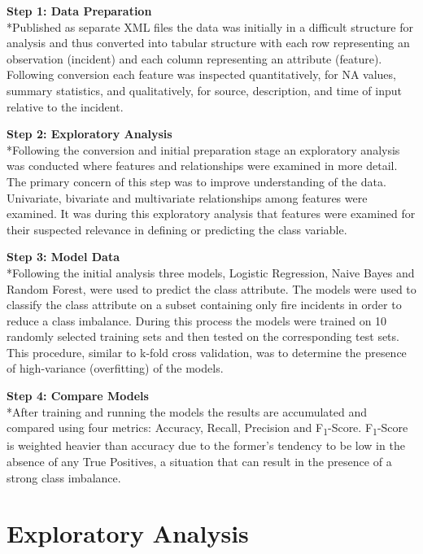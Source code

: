 \documentclass[12pt,letterpaper, oneside]
{article}
\begin{document}
\medskip\noindent\textbf{Step 1: Data Preparation}
\\*Published as separate XML files the data was initially in a difficult structure for analysis and thus converted into tabular structure with each row representing an observation (incident) and each column representing an attribute (feature). Following conversion each feature was inspected quantitatively, for NA values, summary statistics, and qualitatively, for source, description, and time of input relative to the incident. 

\medskip\noindent\textbf{Step 2: Exploratory Analysis}
\\*Following the conversion and initial preparation stage an exploratory analysis was conducted where features and relationships were examined in more detail. The primary concern of this step was to improve understanding of the data. Univariate, bivariate and multivariate relationships among features were examined. It was during this exploratory analysis that features were examined for their suspected relevance in defining or predicting the class variable. 

\medskip\noindent\textbf{Step 3: Model Data}
\\*Following the initial analysis three models, Logistic Regression, Naive Bayes and Random Forest, were used to predict the class attribute. The models were used to classify the class attribute on a subset containing only fire incidents in order to reduce a class imbalance. During this process the models were trained on 10 randomly selected training sets and then tested on the corresponding test sets. This procedure, similar to k-fold cross validation, was to determine the presence of high-variance (overfitting) of the models. 

\medskip\noindent\textbf{Step 4: Compare Models}
\\*After training and running the models the results are accumulated and compared using four metrics: Accuracy, Recall, Precision and F\textsubscript{1}-Score. F\textsubscript{1}-Score is weighted heavier than accuracy due to the former's tendency to be low in the absence of any True Positives, a situation that can result in the presence of a strong class imbalance.

\section{Exploratory Analysis}
\end{document}

